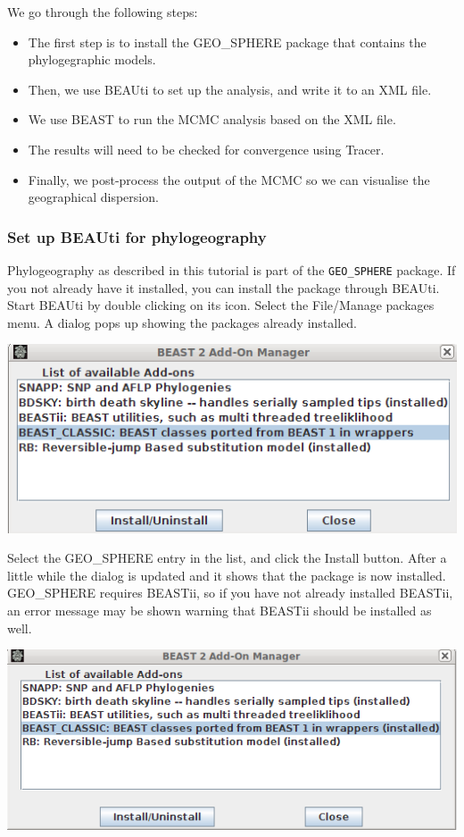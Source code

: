 \documentclass{article}
\def\beast-geo{GEO_SPHERE}
\begin{document}
We go through the following steps:
\begin{itemize}
\item The first step is to install the \beast-geo{} package that contains the phylogegraphic models. 
\item Then, we use BEAUti to set up the analysis, and write it to an XML file.
\item We use BEAST to run the MCMC analysis based on the XML file.
\item The results will need to be checked for convergence using Tracer.
\item Finally, we post-process the output of the MCMC so we can visualise the geographical dispersion.
\end{itemize}

\subsubsection*{Set up BEAUti for phylogeography}

Phylogeography as described in this tutorial is part of the {\tt \beast-geo} package.
If you not already have it installed, you can
install the package through BEAUti. Start BEAUti by double clicking on its icon. 
Select the File/Manage packages menu. A dialog pops up showing the packages already installed. 

\begin{center}
\includegraphics[scale=0.4]{figures/addonmgr.png}
\end{center}

Select the \beast-geo{} entry in the list, and click the Install button. After a little while the dialog is updated and it shows that the package is now installed.
\beast-geo{} requires BEASTii, so if you have not already installed BEASTii, an error message may be shown warning that BEASTii should be installed as well.

\begin{center}
\includegraphics[scale=0.4]{figures/addonmgr2.png}
\end{center}
\end{document}

